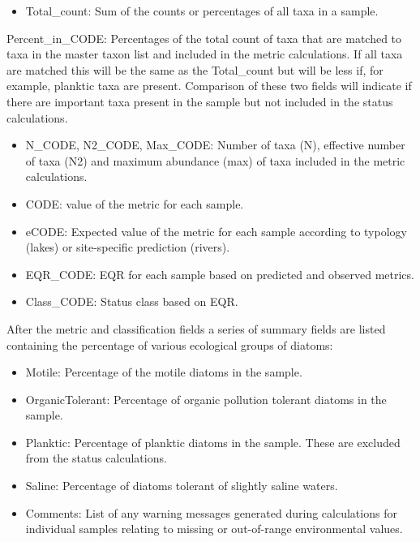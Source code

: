 \documentclass[]{article}
\providecommand{\tightlist}{%
  \setlength{\itemsep}{0pt}\setlength{\parskip}{0pt}}
\begin{document}
\begin{itemize}
\tightlist
\item
  Total\_count: Sum of the counts or percentages of all taxa in a
  sample.
\end{itemize}

Percent\_in\_CODE: Percentages of the total count of taxa that are
matched to taxa in the master taxon list and included in the metric
calculations. If all taxa are matched this will be the same as the
Total\_count but will be less if, for example, planktic taxa are
present. Comparison of these two fields will indicate if there are
important taxa present in the sample but not included in the status
calculations.

\begin{itemize}
\item
  N\_CODE, N2\_CODE, Max\_CODE: Number of taxa (N), effective number of
  taxa (N2) and maximum abundance (max) of taxa included in the metric
  calculations.
\item
  CODE: value of the metric for each sample.
\item
  eCODE: Expected value of the metric for each sample according to
  typology (lakes) or site-specific prediction (rivers).
\item
  EQR\_CODE: EQR for each sample based on predicted and observed
  metrics.
\item
  Class\_CODE: Status class based on EQR.
\end{itemize}

After the metric and classification fields a series of summary fields
are listed containing the percentage of various ecological groups of
diatoms:

\begin{itemize}
\item
  Motile: Percentage of the motile diatoms in the sample.
\item
  OrganicTolerant: Percentage of organic pollution tolerant diatoms in
  the sample.
\item
  Planktic: Percentage of planktic diatoms in the sample. These are
  excluded from the status calculations.
\item
  Saline: Percentage of diatoms tolerant of slightly saline waters.
\item
  Comments: List of any warning messages generated during calculations
  for individual samples relating to missing or out-of-range
  environmental values.
\end{itemize}
\end{document}
